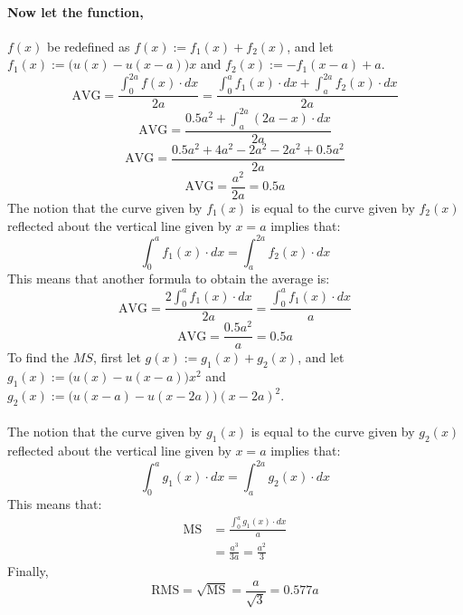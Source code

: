 \documentclass{article}
\begin{document}
	\paragraph[Relation3]{Now let the function,} $f(x)$ be redefined as 
	$f(x):=f_1(x)+f_2(x)$, and let $f_1(x):=\big(u(x)-u(x-a)\big)x$ and 
	$f_2(x):=-f_1(x-a) + a$.
	$$ \text{AVG}=\frac{\int_{0}^{2a}f(x)\cdot dx}{2a} = 
	\frac{\int_{0}^{a}f_1(x)\cdot dx + \int_{a}^{2a}f_2(x) \cdot dx}{2a}$$
	$$ \text{AVG} = \frac{0.5a^2 + \int_{a}^{2a}(2a-x) \cdot dx}{2a}$$
	$$ \text{AVG} = \frac{0.5a^2 + 4a^2 - 2a^2 - 2a^2 + 0.5a^2}{2a}$$
	$$ \text{AVG} = \frac{a^2}{2a} = 0.5a$$
	The notion that the curve given by $f_1(x)$ is equal to the curve given by 
	$f_2(x)$ reflected about the vertical line given by $x=a$ implies that:
	$$ \int_{0}^{a}f_1(x) \cdot dx = \int_{a}^{2a}f_2(x)\cdot dx$$
	This means that another formula to obtain the average is:
	$$ \text{AVG} = \frac{2\int_{0}^{a}f_1(x) \cdot dx}{2a} = 
	\frac{\int_{0}^{a}f_1(x) \cdot dx}{a}$$
	$$ \text{AVG} = \frac{0.5a^2}{a} = 0.5a$$
	To find the $MS$, first let $g(x):=g_1(x)+g_2(x)$, and let 
	$g_1(x):=\big(u(x)-u(x-a)\big)x^2$ and 
	$g_2(x):=\big(u(x-a) - u(x-2a)\big)(x-2a)^2$. \\ \\
	The notion that the curve given by $g_1(x)$ is equal to the curve given by 
	$g_2(x)$ reflected about the vertical line given by $x=a$ implies that:
	$$ \int_{0}^{a}g_1(x) \cdot dx = \int_{a}^{2a}g_2(x)\cdot dx$$
	This means that:
	\begin{align*}
		\text{MS}&=\frac{\int_{0}^{a}g_1(x)\cdot dx}{a} \\
		 &= \frac{a^3}{3a} = \frac{a^2}{3}
	\end{align*}
	Finally,
	$$ \text{RMS} = \sqrt{\text{MS}} = \frac{a}{\sqrt{3}} = 0.577a$$
\end{document}
